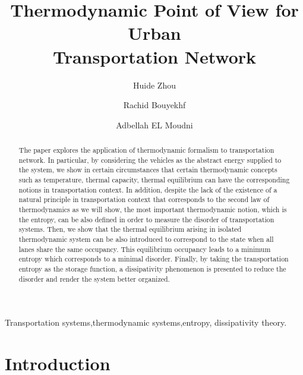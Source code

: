 \documentclass[preprint,authoryear,12pt]{elsarticle}
\begin{document}
\begin{frontmatter}

\title{Thermodynamic Point of View for Urban\\ Transportation Network}
\author[SeT]{Huide Zhou}
\author[SeT]{Rachid Bouyekhf}
\author[SeT]{Adbellah EL Moudni}
\address[SeT]{Laboratoire Syst\`{e}mes et Transports (SeT),\\
Universit\'{e} de Technologie de Belfort-Montb\'{e}liard (UTBM)\\
Rue Thierry Mieg, 90010 Belfort Cedex, France}

\begin{abstract}
The paper  explores the application of thermodynamic  formalism to transportation
network. In particular, by considering
the vehicles as the abstract energy supplied to the system, we show  in
certain circumstances that  certain thermodynamic
concepts such as  temperature, thermal capacity, thermal
equilibrium can have the corresponding notions in transportation
context. In addition, despite the lack  of the existence  of a natural principle in transportation context that corresponds to the second law of thermodynamics as we will show,  the most important
thermodynamic notion, which is the entropy, can be also defined in
order to measure the disorder of transportation systems.
Then, we show that the thermal equilibrium arising in isolated
thermodynamic system can be also introduced to correspond to
the state when all lanes share the same occupancy. This equilibrium
occupancy leads to a minimum entropy which corresponds to a minimal
disorder.
Finally, by taking the transportation entropy as the storage function,
a dissipativity phenomenon is presented to reduce the disorder and
render the system better organized.
\end{abstract}

\begin{keyword}
Transportation systems\sep thermodynamic systems\sep  entropy\sep
dissipativity theory.
\end{keyword}

\end{frontmatter}

\section{Introduction}
\end{document}
